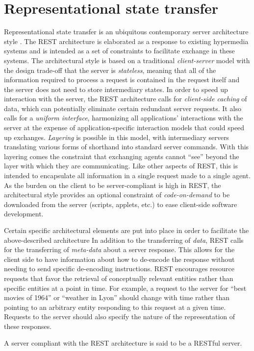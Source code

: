 \documentclass{article}
\begin{document}
\section{Representational state transfer}\label{section:rest}
Representational state transfer \cite{Fielding00} is an ubiquitous contemporary server architecture style \cite{richardson2008restful}. The REST architecture is elaborated as a response to existing hypermedia systems and is intended as a set of constraints to facilitate exchange in these systems.  The architectural style is based on a traditional \emph{client-server} model with the design trade-off that the server is \emph{stateless}, meaning that all of the information required to process a request is contained in the request itself and the server does not need to store intermediary states.  In order to speed up interaction with the server, the REST architecture calls for \emph{client-side caching} of data, which can potentially eliminate certain redundant server requests.  It also calls for a \emph{uniform interface}, harmonizing all applications' interactions with the server at the expense of application-specific interaction models that could speed up exchanges.  \emph{Layering} is possible in this model, with intermediary servers translating various forms of shorthand into standard server commands.  With this layering comes the constraint that exchanging agents cannot ``see'' beyond the layer with which they are communicating.  Like other aspects of REST, this is intended to encapsulate all information in a single request made to a single agent.  As the burden on the client to be server-compliant is high in REST, the architectural style provides an optional constraint of \emph{code-on-demand} to be downloaded from the server (scripts, applets, etc.) to ease client-side software development.\par
Certain specific architectural elements are put into place in order to facilitate the above-described architecture  In addition to the transferring of \emph{data}, REST calls for the transferring of \emph{meta-data} about a server response.  This allows for the client side to have information about how to de-encode the response without needing to send specific de-encoding instructions.  REST encourages resource requests that favor the retrieval of conceptually relevant entities rather than specific entities at a point in time.  For example, a request to the server for ``best movies of 1964'' or ``weather in Lyon'' should change with time rather than pointing to an arbitrary entity responding to this request at a given time.  Requests to the server should also specify the nature of the representation of these responses.\par
A server compliant with the REST architecture is said to be a RESTful server.
\end{document}
